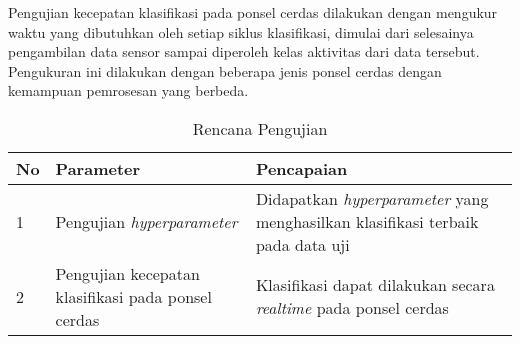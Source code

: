 Pengujian kecepatan klasifikasi pada ponsel cerdas dilakukan dengan mengukur waktu yang dibutuhkan oleh setiap siklus klasifikasi, dimulai dari selesainya pengambilan data sensor sampai diperoleh kelas aktivitas dari data tersebut. Pengukuran ini dilakukan dengan beberapa jenis ponsel cerdas dengan kemampuan pemrosesan yang berbeda.

\begin{table}[h!]
    \centering
    \caption{Rencana Pengujian}
    \begin{tabular}{ |p{0.5cm}|p{5cm}|p{7.5cm}| }
        \hline
        \textbf{No} & \textbf{Parameter} & \textbf{Pencapaian} \\

        \hline
        1 & Pengujian \textit{hyperparameter} & Didapatkan \textit{hyperparameter} yang menghasilkan klasifikasi terbaik pada data uji \\
        
        \hline
        2 & Pengujian kecepatan klasifikasi pada ponsel cerdas & Klasifikasi dapat dilakukan secara \textit{realtime} pada ponsel cerdas \\

        \hline
    \end{tabular}
    \label{table:rencana-pengujian}
\end{table}
